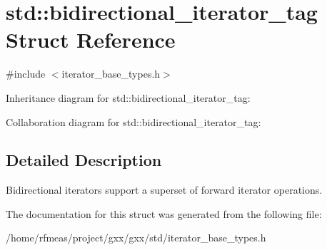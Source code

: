 \hypertarget{structstd_1_1bidirectional__iterator__tag}{}\section{std\+:\+:bidirectional\+\_\+iterator\+\_\+tag Struct Reference}
\label{structstd_1_1bidirectional__iterator__tag}


{\ttfamily \#include $<$iterator\+\_\+base\+\_\+types.\+h$>$}



Inheritance diagram for std\+:\+:bidirectional\+\_\+iterator\+\_\+tag\+:


Collaboration diagram for std\+:\+:bidirectional\+\_\+iterator\+\_\+tag\+:


\subsection{Detailed Description}
Bidirectional iterators support a superset of forward iterator operations. 

The documentation for this struct was generated from the following file\+:\begin{DoxyCompactItemize}
\item 
/home/rfmeas/project/gxx/gxx/std/iterator\+\_\+base\+\_\+types.\+h\end{DoxyCompactItemize}
